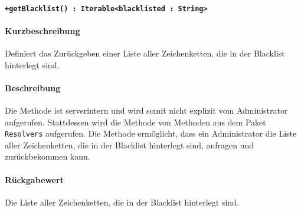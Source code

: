 \paragraph*{\texttt{+getBlacklist() : Iterable<blacklisted : String>}}%
\paragraph*{Kurzbeschreibung}
Definiert das Zurückgeben einer Liste aller Zeichenketten, die in der Blacklist hinterlegt sind.
\paragraph*{Beschreibung}
Die Methode ist serverintern und wird somit nicht explizit vom Administrator aufgerufen.
Stattdessen wird die Methode von Methoden aus dem Paket \texttt{Resolvers} aufgerufen.
Die Methode ermöglicht, dass ein Administrator die Liste aller Zeichenketten, die in der Blacklist hinterlegt sind, anfragen und zurückbekommen kann.
\paragraph*{Rückgabewert}
Die Liste aller Zeichenketten, die in der Blacklist hinterlegt sind.
